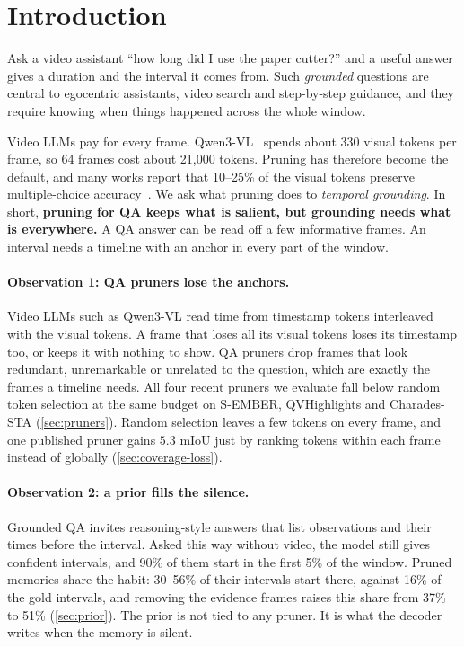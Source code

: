 \section{Introduction}
\label{sec:intro}

Ask a video assistant ``how long did I use the paper cutter?'' and a useful answer gives a duration and the interval
it comes from. Such \emph{grounded} questions are central to egocentric assistants, video search and step-by-step
guidance, and they require knowing when things happened across the whole window.

Video LLMs pay for every frame. Qwen3-VL~\cite{qwen3vl} spends about 330 visual tokens per frame, so 64 frames
cost about 21{,}000 tokens. Pruning has therefore become the default, and many works report that 10--25\% of the
visual tokens preserve multiple-choice accuracy~\cite{fastvid,vidcom2,flashvid,semvid,prunevid,dycoke}. We ask what
pruning does to \emph{temporal grounding}. In short, \textbf{pruning for QA keeps what is salient, but grounding needs
what is everywhere.} A QA answer can be read off a few informative frames. An interval needs a timeline with an anchor
in every part of the window.

\paragraph{Observation 1: QA pruners lose the anchors.}
Video LLMs such as Qwen3-VL read time from timestamp tokens interleaved with the visual tokens. A frame that loses all
its visual tokens loses its timestamp too, or keeps it with nothing to show. QA pruners drop frames that look
redundant, unremarkable or unrelated to the question, which are exactly the frames a timeline needs. All four recent
pruners we evaluate fall below random token selection at the same budget on S-EMBER, QVHighlights and Charades-STA
(\cref{sec:pruners}). Random selection leaves a few tokens on every frame, and one published pruner gains $5.3$ mIoU
just by ranking tokens within each frame instead of globally (\cref{sec:coverage-loss}).

\paragraph{Observation 2: a prior fills the silence.}
Grounded QA invites reasoning-style answers that list observations and their times before the interval.
Asked this way without video, the model still gives confident intervals, and 90\% of them start in the first
5\% of the window. Pruned memories share the habit: 30--56\% of their intervals start there, against 16\% of the gold
intervals, and removing the evidence frames raises this share from 37\% to 51\% (\cref{sec:prior}). The prior is
not tied to any pruner. It is what the decoder writes when the memory is silent.

